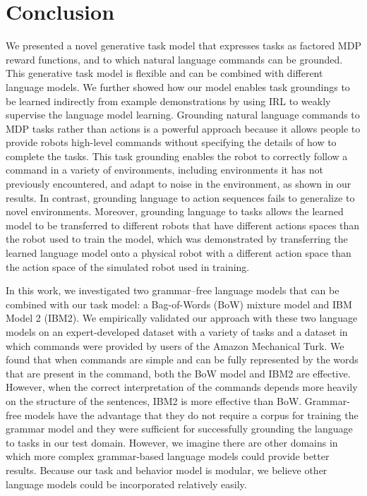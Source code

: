 \documentclass[conference]{IEEEtran}
\begin{document}
\section{Conclusion}
We presented a novel generative task model that expresses tasks as factored MDP reward functions, and to which natural language commands can be grounded. This generative task model is flexible and can be combined with different language models. We further showed how our model enables task groundings to be learned indirectly from example demonstrations by using IRL to weakly supervise the language model learning. Grounding natural language commands to MDP tasks rather than actions is a powerful approach because it allows people to provide robots high-level commands without specifying the details of how to complete the tasks. This task grounding enables the robot to correctly follow a command in a variety of environments, including environments it has not previously encountered, and adapt to noise in the environment, as shown in our results. In contrast, grounding language to action sequences fails to generalize to novel environments. Moreover, grounding language to tasks allows the learned model to be transferred to different robots that have different actions spaces than the robot used to train the model, which was demonstrated by transferring the learned language model onto a physical robot with a different action space than the action space of the simulated robot used in training.

In this work, we investigated two grammar--free language models that can be combined with our task model: a Bag-of-Words (BoW) mixture model and IBM Model 2 (IBM2). %
We empirically validated our approach with these two language models on an expert-developed dataset with a variety of tasks and a dataset in which commands were provided by users of the Amazon Mechanical Turk. We found that when commands are simple and can be fully represented by the words that are present in the command, both the BoW model and IBM2 are effective. However, when the correct interpretation of the commands depends more heavily on the structure of the sentences, IBM2 is more effective than BoW. Grammar-free models have the advantage that they do not require a corpus for training the grammar model and they were sufficient for successfully grounding the language to tasks in our test domain. However, we imagine there are other domains in which more complex grammar-based language models could provide better results. Because our task and behavior model is modular, we believe other language models could be incorporated relatively easily.
\end{document}
